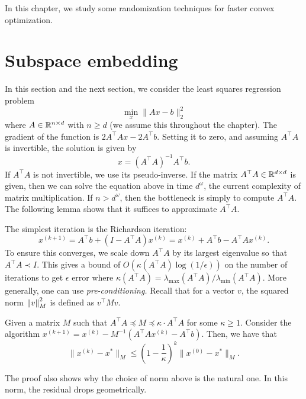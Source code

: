 In this chapter, we study some randomization techniques for faster
convex optimization.

\section{Subspace embedding\label{sec:Subspace-embedding}}

In this section and the next section, we consider the least squares
regression problem
\[
\min_{x}\|Ax-b\|^{2}_{2}
\]
where $A\in\mathbb{R}^{n\times d}$ with $n\ge d$ (we assume this throughout
the chapter). The gradient of the function is $2A^{\top}Ax-2A^{\top}b$.
Setting it to zero, and assuming $A^{\top}A$ is invertible, the solution
is given by 
\[
x=(A^{\top}A)^{-1}A^{\top}b.
\]
If $A^{\top}A$ is not invertible, we use its pseudo-inverse. If the
matrix $A^{\top}A\in\mathbb{R}^{d\times d}$ is given, then we can solve the
equation above in time $d^{\omega}$, the current complexity of matrix
multiplication. If $n>d^{\omega}$, then the bottleneck is simply
to compute $A^{\top}A$. The following lemma shows that it suffices
to approximate $A^{\top}A$. 

The simplest iteration is the Richardson iteration: 
\[
x^{(k+1)}=A^{\top}b+(I-A^{\top}A)x^{(k)}=x^{(k)}+A^{\top}b-A^{\top}Ax^{(k)}.
\]
To ensure this converges, we scale down $A^{\top}A$ by its largest
eigenvalue so that $A^{\top}A\prec I$. This gives a bound of $O(\kappa(A^{\top}A)\log(1/\epsilon))$
on the number of iterations to get $\epsilon$ error where $\kappa(A^{\top}A)=\lambda_{\max}(A^{\top}A)/\lambda_{\min}(A^{\top}A)$.
More generally, one can use \emph{pre-conditioning. }Recall that for
a vector $v$, the squared norm $\left\Vert v\right\Vert^{2}_{M}$ is defined as $v^{\top}Mv$.
\begin{lem}
\label{lem:Richardson}Given a matrix $M$ such that $A^{\top}A\preceq M\preceq\kappa\cdot A^{\top}A$
for some $\kappa\geq1$. Consider the algorithm $x^{(k+1)}=x^{(k)}-M^{-1}(A^{\top}Ax^{(k)}-A^{\top}b)$.
Then, we have that
\[
\|x^{(k)}-x^{*}\|_{M}\leq\left(1-\frac{1}{\kappa}\right)^{k}\|x^{(0)}-x^{*}\|_{M}.
\]
\end{lem}

\begin{rem}
The proof also shows why the choice of norm above is the natural one.
In this norm, the residual drops geometrically.
\end{rem}

